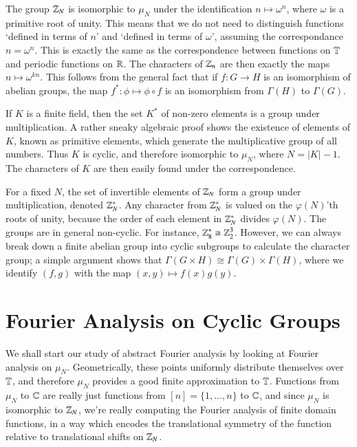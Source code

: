 \begin{example}
    The group $\operatorname{\mathbb{Z}}_N$ is isomorphic to $\mu_N$ under the identification $n \mapsto \omega^n$, where $\omega$ is a primitive root of unity. This means that we do not need to distinguish functions `defined in terms of $n$' and `defined in terms of $\omega$', assuming the correspondance $n = \omega^n$. This is exactly the same as the correspondence between functions on $\operatorname{\mathbb{T}}$ and periodic functions on $\operatorname{\mathbb{R}}$. The characters of $\operatorname{\mathbb{Z}}_n$ are then exactly the maps $n \mapsto \omega^{kn}$. This follows from the general fact that if $f: G \to H$ is an isomorphism of abelian groups, the map $f^*: \phi \mapsto \phi \circ f$ is an isomorphism from $\Gamma(H)$ to $\Gamma(G)$.
\end{example}

\begin{example}
    If $K$ is a finite field, then the set $K^*$ of non-zero elements is a group under multiplication. A rather sneaky algebraic proof shows the existence of elements of $K$, known as primitive elements, which generate the multiplicative group of all numbers. Thus $K$ is cyclic, and therefore isomorphic to $\mu_N$, where $N = |K| - 1$. The characters of $K$ are then easily found under the correspondence.
\end{example}

\begin{example}
    For a fixed $N$, the set of invertible elements of $\operatorname{\mathbb{Z}}_N$ form a group under multiplication, denoted $\operatorname{\mathbb{Z}}_N^*$. Any character from $\operatorname{\mathbb{Z}}_N^*$ is valued on the $\varphi(N)$'th roots of unity, because the order of each element in $\operatorname{\mathbb{Z}}_N^*$ divides $\varphi(N)$. The groups are in general non-cyclic. For instance, $\operatorname{\mathbb{Z}}_8^* \cong \operatorname{\mathbb{Z}}_2^3$. However, we can always break down a finite abelian group into cyclic subgroups to calculate the character group; a simple argument shows that $\Gamma(G \times H) \cong \Gamma(G) \times \Gamma(H)$, where we identify $(f,g)$ with the map $(x,y) \mapsto f(x)g(y)$.
\end{example}

\section{Fourier Analysis on Cyclic Groups}

We shall start our study of abstract Fourier analysis by looking at Fourier analysis on $\mu_N$. Geometrically, these points uniformly distribute themselves over $\operatorname{\mathbb{T}}$, and therefore $\mu_N$ provides a good finite approximation to $\operatorname{\mathbb{T}}$. Functions from $\mu_N$ to $\operatorname{\mathbb{C}}$ are really just functions from $[n] = \{ 1, \dots, n \}$ to $\operatorname{\mathbb{C}}$, and since $\mu_N$ is isomorphic to $\operatorname{\mathbb{Z}}_N$, we're really computing the Fourier analysis of finite domain functions, in a way which encodes the translational symmetry of the function relative to translational shifts on $\operatorname{\mathbb{Z}}_N$.

